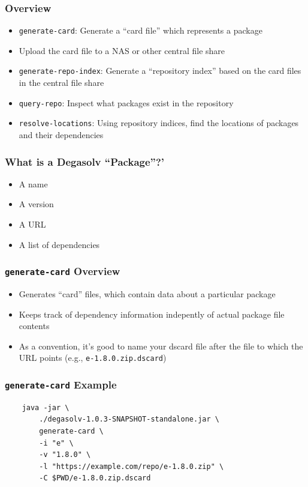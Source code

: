 \documentclass{beamer}
\begin{document}
\begin{frame}
  \frametitle{Overview}
  \begin{itemize}
  \item \texttt{generate-card}: Generate a ``card file'' which represents a package
  \item Upload the card file to a NAS or other central file share
  \item \texttt{generate-repo-index}: Generate a ``repository index'' based on the card files
    in the central file share
  \item \texttt{query-repo}: Inspect what packages exist in the repository
  \item \texttt{resolve-locations}: Using repository indices, find the locations
    of packages and their dependencies
  \end{itemize}
\end{frame}
\begin{frame}
  \frametitle{What is a Degasolv ``Package''?'}
  \begin{itemize}
  \item A name
  \item A version
  \item A URL
  \item A list of dependencies
  \end{itemize}
\end{frame}
\begin{frame}
  \frametitle{\texttt{generate-card} Overview}
  \begin{itemize}
  \item Generates ``card'' files, which contain data about a particular package
  \item Keeps track of dependency information indepently of actual package file contents
  \item As a convention, it's good to name your dscard file after the file to which
    the URL points (e.g., \texttt{e-1.8.0.zip.dscard})
  \end{itemize}
\end{frame}
\begin{frame}[fragile]
  \frametitle{\texttt{generate-card} Example}
\begin{verbatim}
    java -jar \
        ./degasolv-1.0.3-SNAPSHOT-standalone.jar \
        generate-card \
        -i "e" \
        -v "1.8.0" \
        -l "https://example.com/repo/e-1.8.0.zip" \
        -C $PWD/e-1.8.0.zip.dscard
\end{verbatim}
\end{frame}
\end{document}
